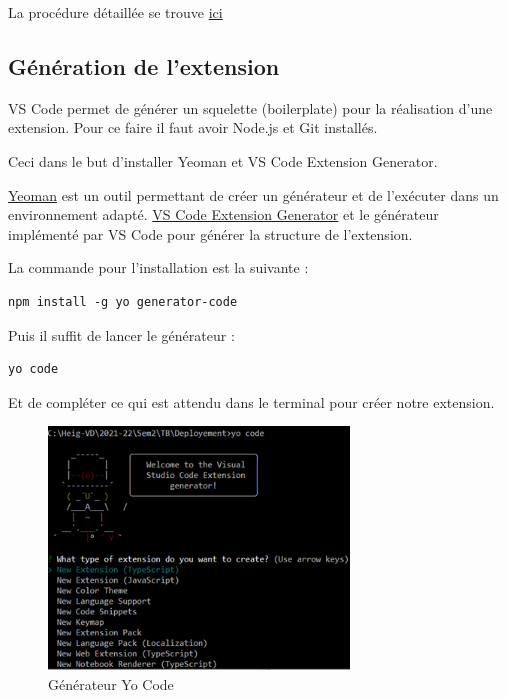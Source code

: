 \documentclass[
    iict, %
    il, %
]{heig-tb}
\begin{document}
La procédure détaillée se trouve \href{https://code.visualstudio.com/api/get-started/your-first-extension
}{ici}

\subsection{Génération de l'extension}

VS Code permet de générer un squelette (boilerplate) pour la réalisation d'une extension.
Pour ce faire il faut avoir Node.js et Git installés.

Ceci dans le but d'installer Yeoman et VS Code Extension Generator.

\href{https://yeoman.io/}{Yeoman} est un outil permettant de créer un générateur et de l'exécuter dans un environnement adapté.
\href{https://www.npmjs.com/package/generator-code}{VS Code Extension Generator} et le générateur implémenté par VS Code pour générer la structure de l'extension.

La commande pour l'installation est la suivante :

\begin{lstlisting}[frame=single]
npm install -g yo generator-code
\end{lstlisting}

Puis il suffit de lancer le générateur :

\begin{lstlisting}[frame=single]
yo code
\end{lstlisting}

Et de compléter ce qui est attendu dans le terminal pour créer notre extension.

\begin{figure}[!h]
    \begin{center}
        \includegraphics[width=8cm]{assets/figures/yo-code.png}
    \end{center}
    \caption[Générateur Yo Code]{\label{yo-code}Générateur Yo Code}
\end{figure}
\end{document}
